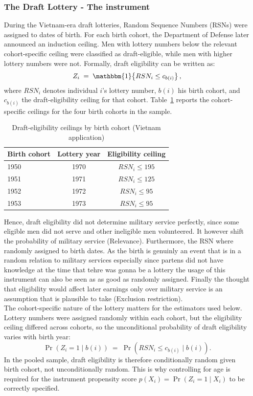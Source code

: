 \documentclass[12pt, a4paper, oneside]{article}
\theoremstyle{plain}
\theoremstyle{definition}
\begin{document}
\subsubsection{The Draft Lottery - The instrument}
During the Vietnam-era draft lotteries, Random Sequence Numbers (RSNs) were assigned to dates of birth. For each birth cohort, the Department of Defense later announced an induction ceiling. Men with lottery numbers below the relevant cohort-specific ceiling were classified as draft-eligible, while men with higher lottery numbers were not. Formally, draft eligibility can be written as: 
\begin{equation}
  Z_i \;=\; \mathbbm{1}\!\left\{RSN_i \leq c_{b(i)}\right\},
  \label{eq:vietnam_z}
\end{equation}
%
where $RSN_i$ denotes individual $i$'s lottery number, $b(i)$ his birth
cohort, and $c_{b(i)}$ the draft-eligibility ceiling for that cohort.
Table~\ref{tab:vietnam_cutoffs} reports the cohort-specific ceilings
for the four birth cohorts in the sample.
\begin{table}[htbp]
\centering
\caption{Draft-eligibility ceilings by birth cohort (Vietnam application)}
\label{tab:vietnam_cutoffs}
\begin{tabular}{@{}lcc@{}}
\toprule
Birth cohort & Lottery year & Eligibility ceiling \\
\midrule
1950 & 1970 & $RSN_i \leq 195$ \\
1951 & 1971 & $RSN_i \leq 125$ \\
1952 & 1972 & $RSN_i \leq 95$  \\
1953 & 1973 & $RSN_i \leq 95$  \\
\bottomrule
\end{tabular}
\end{table}
Hence, draft eligibility did not determine military service perfectly, since some eligible men did not serve and other ineligible men volunteered. It however shift the probability of military service (Relevance).
Furthermore, the RSN where randomly assigned to birth dates. As the birth is genuinly an event that is in a random relation to military services especially since partens did not have knowledge at the time that tehre was gonna be a lottery the usage of this instrument can also be seen as as good as randomly assigned.
Finally the thought that eligibility would affect later earnings only over military service is an assumption that is plausible to take (Exclusion restriction).\\
The cohort-specific nature of the lottery matters for the estimators
used below. Lottery numbers were assigned randomly within each cohort,
but the eligibility ceiling differed across cohorts, so the
unconditional probability of draft eligibility varies with birth year:
%
\begin{equation}
  \Pr(Z_i = 1 \mid b(i)) \;=\; \Pr\!\left(RSN_i \leq c_{b(i)} \mid b(i)\right).
  \label{eq:vietnam_propensity_cohort}
\end{equation}
In the pooled sample, draft eligibility is therefore conditionally
random given birth cohort, not unconditionally random. This is why
controlling for age is required
for the instrument propensity score $p(X_i) = \Pr(Z_i = 1 \mid X_i)$
to be correctly specified.
\end{document}
